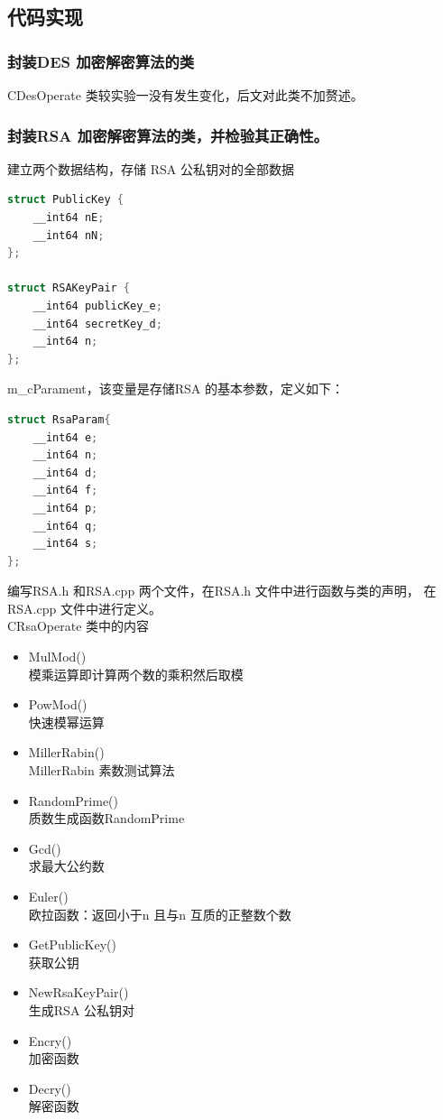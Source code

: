 \documentclass[UTF8,a4paper,10pt]{ctexart}
\begin{document}
\subsection{代码实现}
\subsubsection{封装DES 加密解密算法的类}
CDesOperate 类较实验一没有发生变化，后文对此类不加赘述。
\subsubsection{封装RSA 加密解密算法的类，并检验其正确性。}
建立两个数据结构，存储 RSA 公私钥对的全部数据
\begin{lstlisting}[language = c++]
struct PublicKey {
    __int64 nE;
    __int64 nN;
};

struct RSAKeyPair {
    __int64 publicKey_e;
    __int64 secretKey_d;
    __int64 n;
};
\end{lstlisting}
m\_cParament，该变量是存储RSA 的基本参数，定义如下：
\begin{lstlisting}[language = C++]
struct RsaParam{
    __int64 e;
    __int64 n;
    __int64 d;
    __int64 f;
    __int64 p;
    __int64 q;
    __int64 s;
};  
\end{lstlisting}
编写RSA.h 和RSA.cpp 两个文件，在RSA.h 文件中进行函数与类的声明，
在RSA.cpp 文件中进行定义。\\
CRsaOperate 类中的内容
\begin{itemize}
  \item MulMod()\\ 
  模乘运算即计算两个数的乘积然后取模
  \item PowMod()\\
  快速模幂运算
  \item MillerRabin()\\
  MillerRabin 素数测试算法
  \item RandomPrime() \\ 
  质数生成函数RandomPrime
  \item Gcd()\\ 
  求最大公约数
  \item Euler()\\
  欧拉函数：返回小于n 且与n 互质的正整数个数
  \item GetPublicKey()\\
  获取公钥
  \item NewRsaKeyPair()\\
  生成RSA 公私钥对
  \item Encry()\\
  加密函数
  \item Decry()\\
  解密函数
\end{itemize}
\end{document}
